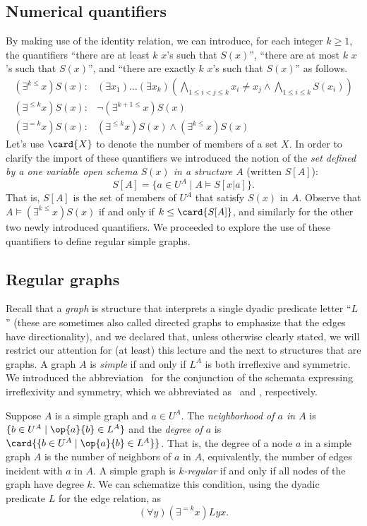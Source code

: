 \subsection{Numerical quantifiers}
By making use of the identity relation, we can introduce, for each integer $k\geq 1$, the quantifiers ``there are at least $k$ $x$'s such that $S(x)$'', ``there are at most $k$ $x$'s such that $S(x)$'', and ``there are exactly  $k$ $x$'s such that $S(x)$'' as follows.
\[
\begin{array}{ll}
(\exists^{k\leq}x)S(x):  & (\exists x_1)\ldots(\exists x_k)(\bigwedge_{1\leq i<j\leq k}x_i\neq x_j\wedge \bigwedge_{1\leq i\leq k}S(x_i))\\
(\exists^{\leq k}x)S(x): & \neg (\exists^{k+1\leq}x)S(x)\\
(\exists^{ = k}x)S(x): & (\exists^{\leq k}x)S(x)\wedge(\exists^{k\leq}x)S(x)
\end{array}
\]
Let's use $\card{X}$ to denote the number of members of a set $X$.    
In order to clarify the import of these quantifiers we introduced the notion of the \emph{set defined by a one variable open schema $S(x)$ in a structure $A$} (written $S[A]$):
\[S[A]=\{a\in U^A\mid A\models S[x|a]\}.\] That is, $S[A]$ is the set of members of $U^A$ that satisfy $S(x)$ in $A$. Observe that $A\models(\exists^{k\leq}x)S(x)$ if and only if $k\leq\card{S[A]}$, and similarly for the other two newly introduced quantifiers. We proceeded to explore the use of these quantifiers to define regular simple graphs.
\subsection{Regular graphs}

Recall that a \emph{graph} is structure that interprets a single dyadic predicate letter ``$L$'' (these are sometimes also called directed graphs to emphasize that the edges have directionality), and we declared that, unless otherwise clearly stated,  we will restrict our attention for (at least) this lecture and the next to structures that are graphs. A graph $A$ is \emph{simple} if and only if $L^A$ is both irreflexive and symmetric. We introduced the abbreviation \sg\ for the conjunction of the schemata expressing irreflexivity and symmetry, which we abbreviated as \irr\ and \sym, respectively. 

Suppose $A$ is a simple graph and $a\in U^A$. The \emph{neighborhood of $a$ in $A$} is $\{b\in U^A\mid \op{a}{b}\in L^A\}$ and the \emph{degree of $a$} is $\card{\{b\in U^A\mid \op{a}{b}\in L^A\}}$. 
That is, the degree of a node $a$ in a simple graph $A$ is the number of neighbors of $a$ in $A$, equivalently, the number of edges incident with $a$ in $A$. A simple graph is \emph{$k$-regular} if and only if all nodes of the graph have degree $k$. We can schematize this condition, using the dyadic predicate $L$ for the edge relation, as
\[(\forall y)(\exists^{=k}x)Lyx.\]

